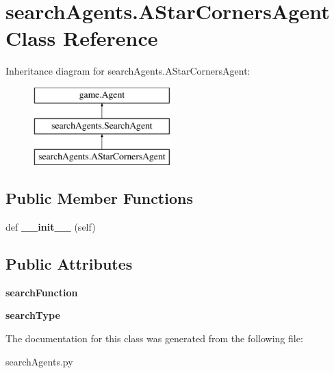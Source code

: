 \hypertarget{classsearch_agents_1_1_a_star_corners_agent}{}\section{search\+Agents.\+A\+Star\+Corners\+Agent Class Reference}
\label{classsearch_agents_1_1_a_star_corners_agent}
Inheritance diagram for search\+Agents.\+A\+Star\+Corners\+Agent\+:\begin{figure}[H]
\begin{center}
\leavevmode
\includegraphics[height=3.000000cm]{classsearch_agents_1_1_a_star_corners_agent}
\end{center}
\end{figure}
\subsection*{Public Member Functions}
\begin{DoxyCompactItemize}
\item 
\mbox{\label{classsearch_agents_1_1_a_star_corners_agent_af62eb95e3d237100325fa774514628e7}} 
def {\bfseries \+\_\+\+\_\+init\+\_\+\+\_\+} (self)
\end{DoxyCompactItemize}
\subsection*{Public Attributes}
\begin{DoxyCompactItemize}
\item 
\mbox{\label{classsearch_agents_1_1_a_star_corners_agent_a8e5fb9dfc31d977e5f302c6e92523615}} 
{\bfseries search\+Function}
\item 
\mbox{\label{classsearch_agents_1_1_a_star_corners_agent_a340f07163c7ccea74ea2155bd6113e77}} 
{\bfseries search\+Type}
\end{DoxyCompactItemize}


The documentation for this class was generated from the following file\+:\begin{DoxyCompactItemize}
\item 
search\+Agents.\+py\end{DoxyCompactItemize}
